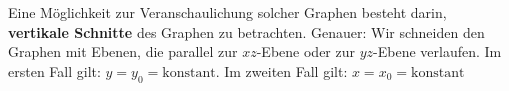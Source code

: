 


Eine Möglichkeit zur Veranschaulichung solcher Graphen besteht darin, \textbf{vertikale Schnitte} des Graphen zu betrachten.
Genauer: Wir schneiden den Graphen mit Ebenen, die parallel zur \( xz \)-Ebene oder zur \( yz \)-Ebene verlaufen. Im ersten Fall gilt: \( y = y_0 = \text{konstant} \). Im zweiten Fall gilt: \( x = x_0 = \text{konstant} \)

